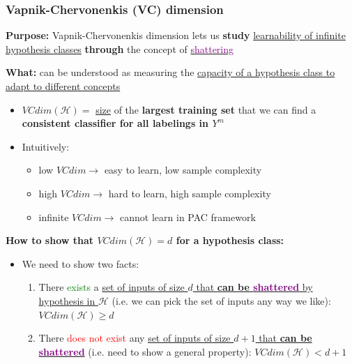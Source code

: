 \documentclass[12pt, a4paper]{article}
\begin{document}
\subsubsection{Vapnik-Chervonenkis (VC) dimension}\label{vapnik-chervonenkis-dimension}

\textbf{Purpose:} Vapnik-Chervonenkis dimension lets us \textbf{study} \uline{learnability of infinite hypothesis classes} \textbf{through} the concept of \uline{\textcolor{Purple}{shattering}}

\textbf{What:} can be understood as measuring the \uline{capacity of a hypothesis class to adapt to different concepts}

\begin{itemize}
  \item $VCdim(\mathcal{H}) =$ \uline{size} of the \textbf{largest training set} that we can find a \textbf{consistent classifier for all labelings in $Y^m$}
  \item Intuitively:
  \begin{itemize}
    \item low $VCdim \rightarrow$ easy to learn, low sample complexity
    \item high $VCdim \rightarrow$ hard to learn, high sample complexity
    \item infinite $VCdim \rightarrow$ cannot learn in PAC framework
  \end{itemize}
\end{itemize}

\bigskip \bigskip

\textbf{How to show that $VCdim(\mathcal{H}) = d$ for a hypothesis class:}
\begin{itemize}
  \item We need to show two facts:
  \begin{enumerate}
    \item There \textcolor{Green}{exists} a \uline{set of inputs of size $d$ that \textbf{can be \textcolor{Purple}{shattered}} by hypothesis in $\mathcal{H}$} (i.e. we can pick the set of inputs any way we like): $VCdim(\mathcal{H}) \geq d$
    \item There \textcolor{Red}{does not exist} any \uline{set of inputs of size $d + 1$ that \textbf{can be \textcolor{Purple}{shattered}}} (i.e. need to show a general property): $VCdim(\mathcal{H}) < d + 1$
  \end{enumerate}
\end{itemize}

\bigskip \bigskip
\end{document}
